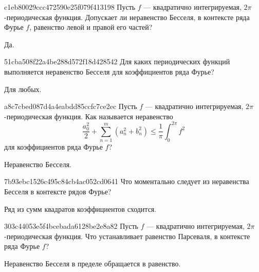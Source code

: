 \begin{note}{c1eb80029ccc472590e25f079f413198}
    Пусть \({ f }\) --- квадратично интегрируемая, \({ 2\pi }\)-периодическая функция.
    Допускает ли неравенство Бесселя, в контексте ряда Фурье \({ f }\), равенство левой и правой его частей?

    \begin{cloze}{1}
        Да.
    \end{cloze}
\end{note}

\begin{note}{51cba508f22a4be288d572f18d428542}
    Для каких периодических функций выполняется неравенство Бесселя для коэффициентов ряда Фурье?

    \begin{cloze}{1}
        Для любых.
    \end{cloze}
\end{note}

\begin{note}{a8c7cbed087d4a4eabdd85ccfc7ce2ec}
    Пусть \({ f }\) --- квадратично интегрируемая, \({ 2\pi }\)-периодическая функция.
    Как называется неравенство
    \[
        \frac{a_0^2}{2} + \sum_{n=1}^{m}  (a_n^2 + b_n^2) \leqslant \frac{1}{\pi} \int_{0}^{2\pi} f^2
    \]
    для коэффициентов ряда Фурье \({ f }\)?

    \begin{cloze}{1}
        Неравенство Бесселя.
    \end{cloze}
\end{note}

\begin{note}{7b93ebc1526c495c84cb4ac052cd0641}
    Что моментально следует из неравенства Бесселя в контексте рядов Фурье?

    \begin{cloze}{1}
        Ряд из сумм квадратов коэффициентов сходится.
    \end{cloze}
\end{note}

\begin{note}{303c44053e5f4bcebada6128be2e8a82}
    Пусть \({ f }\) --- квадратично интегрируемая, \({ 2\pi }\)-периодическая функция.
    Что устанавливает равенство Парсеваля, в контексте ряда Фурье \({ f }\)?

    \begin{cloze}{1}
        Неравенство Бесселя в пределе обращается в равенство.
    \end{cloze}
\end{note}

